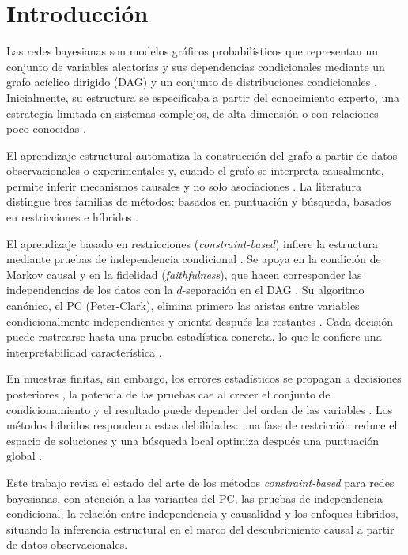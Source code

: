 ﻿\section{Introducción}

Las redes bayesianas son modelos gráficos probabilísticos que representan un conjunto de variables aleatorias y sus dependencias condicionales mediante un grafo acíclico dirigido (DAG) y un conjunto de distribuciones condicionales \citep{pearl2009causality, lauritzen1996graphical}. Inicialmente, su estructura se especificaba a partir del conocimiento experto, una estrategia limitada en sistemas complejos, de alta dimensión o con relaciones poco conocidas \citep{scanagatta2019survey, kitson2023survey}.

El aprendizaje estructural automatiza la construcción del grafo a partir de datos observacionales o experimentales y, cuando el grafo se interpreta causalmente, permite inferir mecanismos causales y no solo asociaciones \citep{spirtes2000causation, glymour2019review}. La literatura distingue tres familias de métodos: basados en puntuación y búsqueda, basados en restricciones e híbridos \citep{scanagatta2019survey, kitson2023survey}.

El aprendizaje basado en restricciones (\emph{constraint-based}) infiere la estructura mediante pruebas de independencia condicional \citep{spirtes2000causation, Averin2026Survey}. Se apoya en la condición de Markov causal y en la fidelidad (\emph{faithfulness}), que hacen corresponder las independencias de los datos con la $d$-separación en el DAG \citep{spirtes2000causation, pearl2009causality}. Su algoritmo canónico, el PC (Peter-Clark), elimina primero las aristas entre variables condicionalmente independientes y orienta después las restantes \citep{spirtes1991algorithm}. Cada decisión puede rastrearse hasta una prueba estadística concreta, lo que le confiere una interpretabilidad característica \citep{glymour2019review, Averin2026Survey}.

En muestras finitas, sin embargo, los errores estadísticos se propagan a decisiones posteriores \citep{spirtes2000causation, uhler2013geometry}, la potencia de las pruebas cae al crecer el conjunto de condicionamiento \citep{abellan2006variations, kocaoglu2023small} y el resultado puede depender del orden de las variables \citep{colombo2014order}. Los métodos híbridos responden a estas debilidades: una fase de restricción reduce el espacio de soluciones y una búsqueda local optimiza después una puntuación global \citep{tsamardinos2006max, kitson2023survey}.

Este trabajo revisa el estado del arte de los métodos \emph{constraint-based} para redes bayesianas, con atención a las variantes del PC, las pruebas de independencia condicional, la relación entre independencia y causalidad y los enfoques híbridos, situando la inferencia estructural en el marco del descubrimiento causal a partir de datos observacionales.
